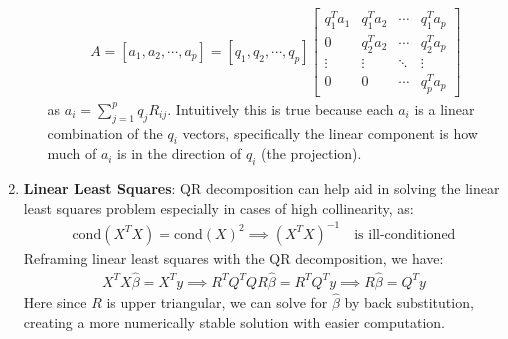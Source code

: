 \documentclass[letterpaper, 11pt]{article}
\newcommand{\1}{\mathds{1}}	%
\theoremstyle{definition}
\begin{document}
\begin{enumerate}
\begin{enumerate}
\begin{align}
            A = [a_1, a_2, \cdots, a_p] = [q_1, q_2, \cdots, q_p] \begin{bmatrix} q_1^T a_1 & q_1^T a_2 & \cdots & q_1^T a_p \\ 0 & q_2^T a_2 & \cdots & q_2^T a_p \\ \vdots & \vdots & \ddots & \vdots \\ 0 & 0 & \cdots & q_p^T a_p \end{bmatrix}
        \end{align}
        as $a_i = \sum_{j=1}^{p} q_j R_{ij}$. Intuitively this is true because each $a_i$ is a linear combination of the $q_i$ vectors, specifically
        the linear component is how much of $a_i$ is in the direction of $q_i$ (the projection).
    \end{enumerate}
    \item \textbf{Linear Least Squares}: QR decomposition can help aid in solving the linear least squares problem 
    especially in cases of high collinearity, as:
    \begin{align}
        \text{cond}(X^T X) = \text{cond}(X)^2 \implies (X^T X)^{-1} \quad \text{is ill-conditioned}
    \end{align} 
    Reframing linear least squares with the QR decomposition, we have:
    \begin{align}
        X^T X \hat{\beta} = X^T y \implies R^T Q^T Q R \hat{\beta} = R^T Q^T y \implies R \hat{\beta} = Q^T y
    \end{align}
    Here since $R$ is upper triangular, we can solve for $\hat{\beta}$ by back substitution, 
    creating a more numerically stable solution with easier computation.
     
\end{enumerate}
\end{document}

